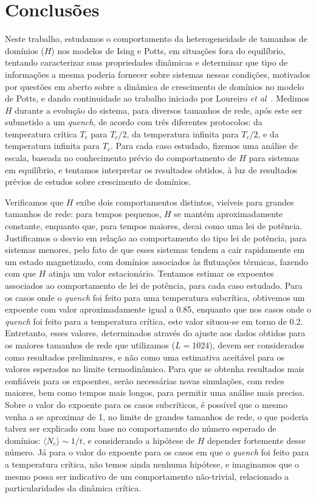 \chapter{Conclusões}
\label{Conclusoes}

Neste trabalho, estudamos o comportamento da heterogeneidade de tamanhos de domínios ($H$) nos modelos de Ising e Potts, em situações fora do equilíbrio, tentando caracterizar suas propriedades dinâmicas e determinar que tipo de informações a mesma poderia fornecer sobre sistemas nessas condições, motivados por questões em aberto sobre a dinâmica de crescimento de domínios no modelo de Potts, e dando continuidade ao trabalho iniciado por Loureiro \textit{et al}~\cite{LoureiroPRE}. Medimos $H$ durante a evolução do sistema, para diversos tamanhos de rede, após este ser submetido a um \textit{quench}, de acordo com três diferentes protocolos: da temperatura crítica $T_c$ para $T_c/2$, da temperatura infinita para $T_c/2$, e da temperatura infinita para $T_c$. Para cada caso estudado, fizemos uma análise de escala, baseada no conhecimento prévio do comportamento de $H$ para sistemas em equilíbrio, e tentamos interpretar os resultados obtidos, à luz de resultados prévios de estudos sobre crescimento de domínios.

Verificamos que $H$ exibe dois comportamentos distintos, visíveis para grandes tamanhos de rede: para tempos pequenos, $H$ se mantém aproximadamente constante, enquanto que, para tempos maiores, decai como uma lei de potência. Justificamos o desvio em relação ao comportamento do tipo lei de potência, para sistemas menores, pelo fato de que esses sistemas tendem a cair rapidamente em um estado magnetizado, com domínios associados às flutuações térmicas, fazendo com que $H$ atinja um valor estacionário. Tentamos estimar os expoentes associados ao comportamento de lei de potência, para cada caso estudado. Para os casos onde o \textit{quench} foi feito para uma temperatura subcrítica, obtivemos um expoente com valor aproximadamente igual a 0.85, enquanto que nos casos onde o \textit{quench} foi feito para a temperatura crítica, este valor situou-se em torno de 0.2. Entretanto, esses valores, determinados através do ajuste aos dados obtidos para os maiores tamanhos de rede que utilizamos ($L=1024$), devem ser considerados como resultados preliminares, e não como uma estimativa aceitável para os valores esperados no limite termodinâmico. Para que se obtenha resultados mais confiáveis para os expoentes, serão necessárias novas simulações, com redes maiores, bem como tempos mais longos, para permitir uma análise mais precisa. Sobre o valor do expoente para os casos subcríticos, é possível que o mesmo venha a se aproximar de 1, no limite de grandes tamanhos de rede, o que poderia talvez ser explicado com base no comportamento do número esperado de domínios: $\langle N_c \rangle \sim 1/t$, e considerando a hipótese de $H$ depender fortemente desse número. Já para o valor do expoente para os casos em que o \textit{quench} foi feito para a temperatura crítica, não temos ainda nenhuma hipótese, e imaginamos que o mesmo possa ser indicativo de um comportamento não-trivial, relacionado a particularidades da dinâmica crítica.

